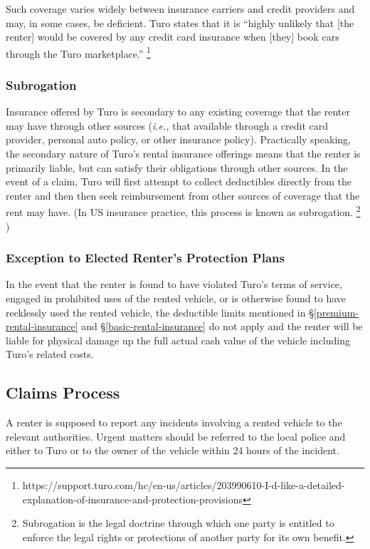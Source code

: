 \documentclass[preprint,12pt]{elsarticle}
\begin{document}
Such coverage varies widely between insurance carriers and credit providers and may, in some cases, be deficient. Turo states that it is ``highly unlikely that [the renter] would be covered by any credit card insurance when [they] book cars through the Turo marketplace.''
\footnote{https://support.turo.com/hc/en-us/articles/203990610-I-d-like-a-detailed-explanation-of-insurance-and-protection-provisions}

\subsubsection{Subrogation}
Insurance offered by Turo is secondary to any existing coverage that the renter may have through other sources (\emph{i.e.,} that available through a credit card provider, personal auto policy, or other insurance policy). Practically speaking, the secondary nature of Turo's rental insurance offerings means that the renter is primarily liable, but can satisfy their obligations through other sources. In the event of a claim, Turo will first attempt to collect deductibles directly from the renter and then then seek reimbursement from other sources of coverage that the rent may have. (In US insurance practice, this process is known as subrogation.
\footnote{Subrogation is the legal doctrine through which one party is entitled to enforce the legal rights or protections of another party for its own benefit.
}
)

\subsubsection{Exception to Elected Renter's Protection Plans}
In the event that the renter is found to have violated Turo's terms of service, engaged in prohibited uses of the rented vehicle, or is otherwise found to have recklessly used the rented vehicle, the deductible limits mentioned in \S\ref{premium-rental-insurance} and \S\ref{basic-rental-insurance} do not apply and the renter will be liable for physical damage up the full actual cash value of the vehicle including Turo's related costs.

\subsection{Claims Process}\label{claims-process}
A renter is supposed to report any incidents involving a rented vehicle to the relevant authorities. Urgent matters should be referred to the local police and either to Turo or to the owner of the vehicle within 24 hours of the incident.
\end{document}
